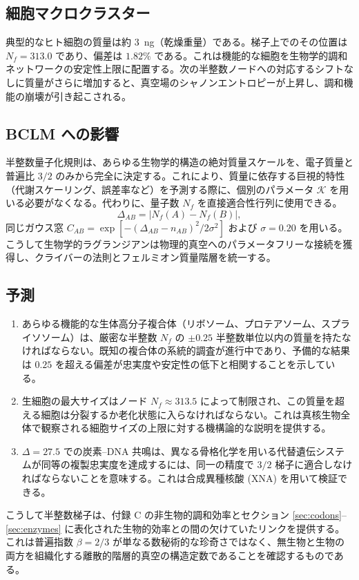 \documentclass[12pt,a4paper]{ltjsarticle}
\newcommand{\REL}{\mathcal{K}}          %
\begin{document}
	\subsection{細胞マクロクラスター}
	典型的なヒト細胞の質量は約 3~ng（乾燥重量）である。梯子上でのその位置は \(N_f = 313.0\) であり、偏差は \(1.82\%\) である。これは機能的な細胞を生物学的調和ネットワークの安定性上限に配置する。次の半整数ノードへの対応するシフトなしに質量がさらに増加すると、真空場のシャノンエントロピーが上昇し、調和機能の崩壊が引き起こされる。
	
	\subsection{BCLM への影響}
	半整数量子化規則は、あらゆる生物学的構造の絶対質量スケールを、電子質量と普遍比 \(3/2\) のみから完全に決定する。これにより、質量に依存する巨視的特性（代謝スケーリング、誤差率など）を予測する際に、個別のパラメータ \(\REL\) を用いる必要がなくなる。代わりに、量子数 \(N_f\) を直接適合性行列に使用できる。
	\[
	\Delta_{AB} = |N_f(A) - N_f(B)|,
	\]
	同じガウス窓 \(C_{AB} = \exp[-(\Delta_{AB} - n_{AB})^2/2\sigma^2]\) および \(\sigma=0.20\) を用いる。こうして生物学的ラグランジアンは物理的真空へのパラメータフリーな接続を獲得し、クライバーの法則とフェルミオン質量階層を統一する。
	
	\subsection{予測}
	\begin{enumerate}
		\item あらゆる機能的な生体高分子複合体（リボソーム、プロテアソーム、スプライソソーム）は、厳密な半整数 \(N_f\) の \(\pm 0.25\) 半整数単位以内の質量を持たなければならない。既知の複合体の系統的調査が進行中であり、予備的な結果は \(0.25\) を超える偏差が忠実度や安定性の低下と相関することを示している。
		\item 生細胞の最大サイズはノード \(N_f \approx 313.5\) によって制限され、この質量を超える細胞は分裂するか老化状態に入らなければならない。これは真核生物全体で観察される細胞サイズの上限に対する機構論的な説明を提供する。
		\item \(\Delta = 27.5\) での炭素–DNA 共鳴は、異なる骨格化学を用いる代替遺伝システムが同等の複製忠実度を達成するには、同一の精度で \(3/2\) 梯子に適合しなければならないことを意味する。これは合成異種核酸 (XNA) を用いて検証できる。
	\end{enumerate}
	
	こうして半整数梯子は、付録 C の非生物的調和効率とセクション \ref{sec:codons}–\ref{sec:enzymes} に表化された生物的効率との間の欠けていたリンクを提供する。これは普遍指数 \(\beta = 2/3\) が単なる数秘術的な珍奇さではなく、無生物と生物の両方を組織化する離散的階層的真空の構造定数であることを確認するものである。
	
\end{document}
